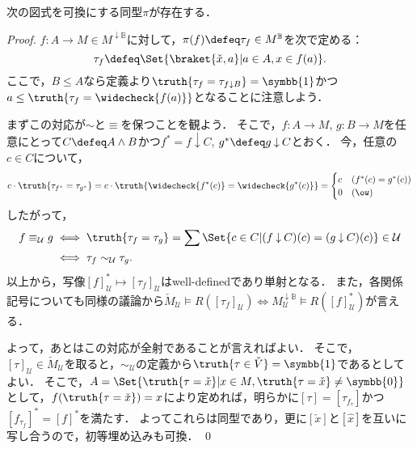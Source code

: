 \documentclass[a4j]{ltjsarticle}
\newcommand{\mathds}[1]{\symbb{#1}}
\DeclareMathOperator{\spanning}{\downarrow}
\newcommand{\reduce}{\mathbin{\downarrow}}
\begin{document}
\begin{theorem}
 次の図式を可換にする同型$\pi$が存在する．
 \begin{center}
 \end{center}
\end{theorem}
\begin{proof}
 $f: A \to M \in M^{\spanning \mathbb{B}}$に対して，$\pi(f) \defeq \tau_f \in M^{\mathbb B}$を次で定める：
 \[
  \tau_f \defeq \Set{ \braket{\check{x}, a} | a \in A, x \in f(a) }.
 \]
 ここで，$B \leq A$なら定義より$\truth{\tau_f = \tau_{f \reduce B}} = \mathds{1}$かつ$a \leq \truth{\tau_f = \widecheck{f(a)}}$となることに注意しよう．

 まずこの対応が$\sim$と$\equiv$を保つことを観よう．
 そこで，$f : A \to M$, $g: B \to M$を任意にとって$C \defeq A \wedge B$かつ$f^* = f \reduce C$, $g^* \defeq g \reduce C$とおく．
 今，任意の$c \in C$について，
 \begin{align*}
  c \cdot \truth{\tau_{f^*} = \tau_{g^*}} = c \cdot \truth{\widecheck{f^*(c)} = \widecheck{g^*(c)}} =
  \begin{cases}
   c & (f^*(c) = g^*(c))\\
   0 & (\ow) 
  \end{cases}
 \end{align*}
 したがって，
 \begin{align*}
  f \equiv_\mathcal{U} g
  &\iff \truth{\tau_f = \tau_g} = \sum \Set{c \in C | (f \reduce C)(c) = (g \reduce C)(c)} \in \mathcal{U}\\
  &\iff \tau_f \sim_{\mathcal{U}}  \tau_g.
 \end{align*}
 以上から，写像$[f]^*_{\mathcal{U}} \mapsto [\tau_f]_{\mathcal{U}}$はwell-definedであり単射となる．
 また，各関係記号についても同様の議論から$\check{M}_{\mathcal{U}} \models R([\tau_f]_{\mathcal{U}}) \iff M^{\spanning \mathbb{B}}_\mathcal{U} \models R([f]^*_{\mathcal{U}})$が言える．

 よって，あとはこの対応が全射であることが言えればよい．
 そこで，$[\tau]_\mathcal{U} \in \check{M}_\mathcal{U}$を取ると，$\sim_{\mathcal{U}}$の定義から$\truth{\tau \in \check{V}} = \mathds{1}$であるとしてよい．
 そこで，$A = \Set{\truth{\tau = \check{x}} | x \in M, \truth{\tau = \check{x}} \neq \mathds{0}}$として，$f(\truth{\tau = \check{x}}) = x$により定めれば，明らかに$[\tau] = [\tau_{f_\tau}]$かつ$[f_{\tau_f}]^* = [f]^*$を満たす．
 よってこれらは同型であり，更に$[\check{x}]$と$[\hat{x}]$を互いに写し合うので，初等埋め込みも可換． \qed
\end{proof}
\end{document}
